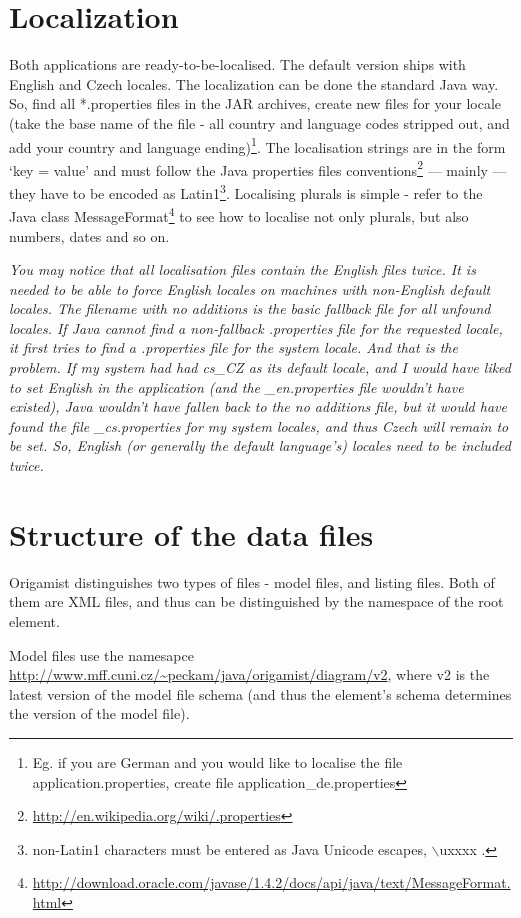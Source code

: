 \section{Localization}
Both applications are ready-to-be-localised. The default version ships with English and Czech locales. The localization can be done the standard Java way. So, find all *.properties files in the JAR archives, create new files for your locale (take the base name of the file - all country and language codes stripped out, and add your country and language ending)\footnote{Eg. if you are German and you would like to localise the file application.properties, create file application\_de.properties}. The localisation strings are in the form `key = value' and must follow the Java properties files conventions\footnote{\url{http://en.wikipedia.org/wiki/.properties}} --- mainly --- they have to be encoded as Latin1\footnote{non-Latin1 characters must be entered as Java Unicode escapes, $\backslash$uxxxx .}. Localising plurals is simple - refer to the Java class MessageFormat\footnote{\url{http://download.oracle.com/javase/1.4.2/docs/api/java/text/MessageFormat.html}} to see how to localise not only plurals, but also numbers, dates and so on.

\textit{You may notice that all localisation files contain the English files twice. It is needed to be able to force English locales on machines with non-English default locales. The filename with no additions is the basic fallback file for all unfound locales. If Java cannot find a non-fallback .properties file for the requested locale, it first tries to find a .properties file for the system locale. And that is the problem. If my system had had cs\_CZ as its default locale, and I would have liked to set English in the application (and the \_en.properties file wouldn't have existed), Java wouldn't have fallen back to the no additions file, but it would have found the file \_cs.properties for my system locales, and thus Czech will remain to be set. So, English (or generally the default language's) locales need to be included twice.}

\section{Structure of the data files}
\label{sec:dataFilesStructure}
Origamist distinguishes two types of files - model files, and listing files. Both of them are XML files, and thus can be distinguished by the namespace of the root element.

Model files use the namesapce \\ \url{http://www.mff.cuni.cz/~peckam/java/origamist/diagram/v2},
where v2 is the latest version of the model file schema (and thus the element's schema determines the version of the model file).

